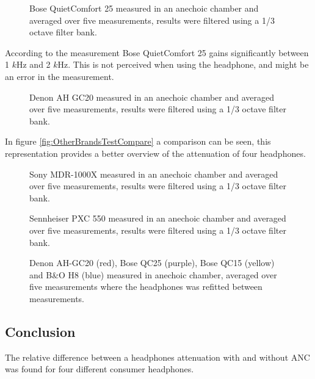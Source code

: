 \begin{figure}[H]
	\centering
	
	\caption{Bose QuietComfort 25 measured in an anechoic chamber and averaged over five measurements, results were filtered using a 1/3 octave filter bank.}
	\label{fig:QC25Comp}
\end{figure}
According to the measurement Bose QuietComfort 25 gains significantly between 1 $k$Hz and 2 $k$Hz. This is not perceived when using the headphone, and might be an error in the measurement. 

\begin{figure}[H]
	\centering
	
	\caption{Denon AH GC20 measured in an anechoic chamber and averaged over five measurements, results were filtered using a 1/3 octave filter bank.}
	\label{fig:DenonComp}
\end{figure}

In figure \autoref{fig:OtherBrandsTestCompare} a comparison can be seen, this representation provides a better overview of the attenuation of four headphones.

\begin{figure}[H]
	\centering
	\caption{Sony MDR-1000X measured in an anechoic chamber and averaged over five measurements, results were filtered using a 1/3 octave filter bank.}
	\label{fig:Sony1000Comp}
\end{figure}

\begin{figure}[H]
	\centering
	\caption{Sennheiser PXC 550 measured in an anechoic chamber and averaged over five measurements, results were filtered using a 1/3 octave filter bank.}
	\label{fig:QC25Comp}
\end{figure}


\begin{figure}[H]
	\centering
	
	\caption{Denon AH-GC20 (red), Bose QC25 (purple), Bose QC15 (yellow) and B\&O H8 (blue) measured in anechoic chamber, averaged over five measurements where the headphones was refitted between measurements.}
	\label{fig:OtherBrandsTestCompare}
\end{figure}




\subsection{Conclusion}
The relative difference between a headphones attenuation with and without ANC was found for four different consumer headphones.



